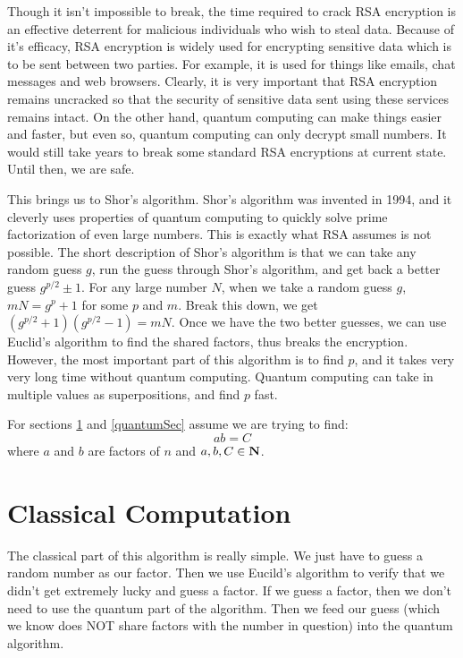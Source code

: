 \documentclass[a4paper]{article}
\begin{document}
Though it isn't impossible to break, the time required to crack RSA encryption is an effective deterrent for malicious individuals who wish to steal data. Because of it's efficacy, RSA encryption is widely used for encrypting sensitive data which is to be sent between two parties. For example, it is used for things like emails, chat messages and web browsers. Clearly, it is very important that RSA encryption remains uncracked so that the security of sensitive data sent using these services remains intact. On the other hand, quantum computing can make things easier and faster, but even so, quantum computing can only decrypt small numbers. It would still take years to break some standard RSA encryptions at current state. Until then, we are safe.

This brings us to Shor's algorithm. Shor's algorithm was invented in 1994, and it cleverly uses properties of quantum computing to quickly solve prime factorization of even large numbers. This is exactly what RSA assumes is not possible. The short description of Shor's algorithm is that we can take any random guess $g$, run the guess through Shor's algorithm, and get back a better guess $g^{p/2} \pm 1$. For any large number $N$, when we take a random guess $g$, $mN = g^p +1$ for some $p$ and $m$. Break this down, we get $(g^{p/2}+1)(g^{p/2}-1) = mN$. Once we have the two better guesses, we can use Euclid's algorithm to find the shared factors, thus breaks the encryption. However, the most important part of this algorithm is to find $p$, and it takes very very long time without quantum computing. Quantum computing can take in multiple values as superpositions, and find $p$ fast.

For sections \ref{classicalSec} and \ref{quantumSec} assume we are trying to find: 
$$ab = C$$
where $a$ and $b$ are factors of $n$ and $a,b,C \in \mathbf{N}$.

\section{Classical Computation}
\label{classicalSec}
The classical part of this algorithm is really simple. We just have to guess a random number as our factor. Then we use Eucild's algorithm to verify that we didn't get extremely lucky and guess a factor. If we guess a factor, then we don't need to use the quantum part of the algorithm. Then we feed our guess (which we know does NOT share factors with the number in question) into the quantum algorithm. 
\end{document}
